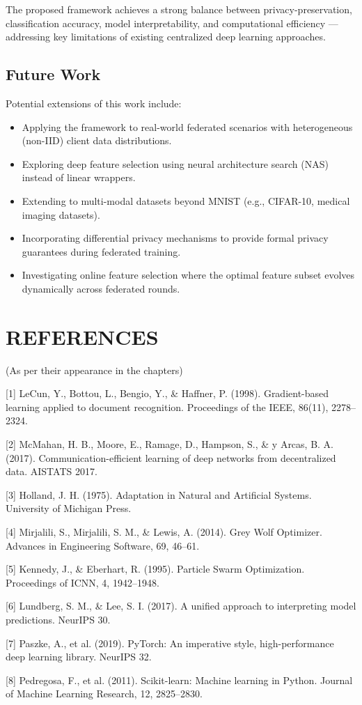 \documentclass[
]{article}
\begin{document}
The proposed framework achieves a strong balance between
privacy-preservation, classification accuracy, model interpretability,
and computational efficiency --- addressing key limitations of existing
centralized deep learning approaches.

\hypertarget{future-work}{%
\subsection{Future Work}\label{future-work}}

Potential extensions of this work include:

\begin{itemize}
\item
  Applying the framework to real-world federated scenarios with
  heterogeneous (non-IID) client data distributions.
\item
  Exploring deep feature selection using neural architecture search
  (NAS) instead of linear wrappers.
\item
  Extending to multi-modal datasets beyond MNIST (e.g., CIFAR-10,
  medical imaging datasets).
\item
  Incorporating differential privacy mechanisms to provide formal
  privacy guarantees during federated training.
\item
  Investigating online feature selection where the optimal feature
  subset evolves dynamically across federated rounds.
\end{itemize}

\hypertarget{references}{%
\section{REFERENCES}\label{references}}

(As per their appearance in the chapters)

{[}1{]} LeCun, Y., Bottou, L., Bengio, Y., \& Haffner, P. (1998).
Gradient-based learning applied to document recognition. Proceedings of
the IEEE, 86(11), 2278--2324.

{[}2{]} McMahan, H. B., Moore, E., Ramage, D., Hampson, S., \& y Arcas,
B. A. (2017). Communication-efficient learning of deep networks from
decentralized data. AISTATS 2017.

{[}3{]} Holland, J. H. (1975). Adaptation in Natural and Artificial
Systems. University of Michigan Press.

{[}4{]} Mirjalili, S., Mirjalili, S. M., \& Lewis, A. (2014). Grey Wolf
Optimizer. Advances in Engineering Software, 69, 46--61.

{[}5{]} Kennedy, J., \& Eberhart, R. (1995). Particle Swarm
Optimization. Proceedings of ICNN, 4, 1942--1948.

{[}6{]} Lundberg, S. M., \& Lee, S. I. (2017). A unified approach to
interpreting model predictions. NeurIPS 30.

{[}7{]} Paszke, A., et al. (2019). PyTorch: An imperative style,
high-performance deep learning library. NeurIPS 32.

{[}8{]} Pedregosa, F., et al. (2011). Scikit-learn: Machine learning in
Python. Journal of Machine Learning Research, 12, 2825--2830.
\end{document}
